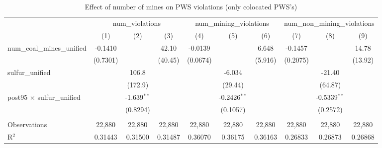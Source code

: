 
\begin{table}[htbp]
   \caption{\label{olsrf2sls_nummine_count_vio_1985to2005colocate_coalunified} Effect of number of mines on PWS violations (only colocated PWS's)}
   \bigskip
   \centering
   \begin{adjustbox}{width = \textwidth, center}
      \begin{tabular}{lccccccccc}
         \toprule
          & \multicolumn{3}{c}{num\_violations} & \multicolumn{3}{c}{num\_mining\_violations} & \multicolumn{3}{c}{num\_non\_mining\_violations}\\
                                                          & (1)           & (2)           & (3)           & (4)           & (5)            & (6)           & (7)           & (8)            & (9)\\  
         \midrule 
         num\_coal\_mines\_unified                        & -0.1410       &               & 42.10         & -0.0139       &                & 6.648         & -0.1457       &                & 14.78\\   
                                                          & (0.7301)      &               & (40.45)       & (0.0674)      &                & (5.916)       & (0.2075)      &                & (13.92)\\   
         sulfur\_unified                                  &               & 106.8         &               &               & -6.034         &               &               & -21.40         &   \\   
                                                          &               & (172.9)       &               &               & (29.44)        &               &               & (64.87)        &   \\   
         post95 $\times$ sulfur\_unified                  &               & -1.639$^{**}$ &               &               & -0.2426$^{**}$ &               &               & -0.5339$^{**}$ &   \\   
                                                          &               & (0.8294)      &               &               & (0.1057)       &               &               & (0.2572)       &   \\   
          \\
         Observations                                     & 22,880        & 22,880        & 22,880        & 22,880        & 22,880         & 22,880        & 22,880        & 22,880         & 22,880\\  
         R$^2$                                            & 0.31443       & 0.31500       & 0.31487       & 0.36070       & 0.36175        & 0.36163       & 0.26833       & 0.26873        & 0.26868\\  

\end{tabular}
\end{adjustbox}
\end{table}
